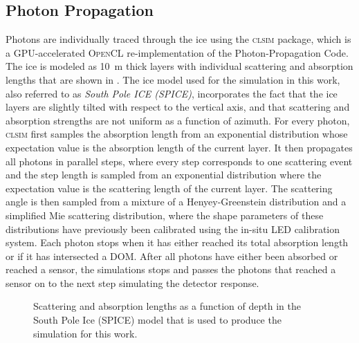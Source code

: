 \subsection{Photon Propagation}
\label{sec:photon-propagation}

Photons are individually traced through the ice using the \textsc{clsim}\cite{clsim} package, which is a GPU-accelerated \textsc{OpenCL} re-implementation of the Photon-Propagation Code.
 The ice is modeled as 10~m thick layers with individual scattering and absorption lengths that are shown in .
The ice model used for the simulation in this work, also referred to as \emph{South Pole ICE (SPICE)}, incorporates the fact that the ice layers are slightly tilted with respect to the vertical axis, and that scattering and absorption strengths are not uniform as a function of azimuth.
For every photon, \textsc{clsim} first samples the absorption length from an exponential distribution whose expectation value is the absorption length of the current layer.
It then propagates all photons in parallel steps, where every step corresponds to one scattering event and the step length is sampled from an exponential distribution where the expectation value is the scattering length of the current layer.
The scattering angle is then sampled from a mixture of a Henyey-Greenstein distribution and a simplified Mie scattering distribution, where the shape parameters of these distributions have previously been calibrated using the in-situ LED calibration system\cite{flasher_calibration}.
Each photon stops when it has either reached its total absorption length or if it has intersected a DOM.
After all photons have either been absorbed or reached a sensor, the simulations stops and passes the photons that reached a sensor on to the next step simulating the detector response.

\begin{figure}
    \centering
    
    \caption{Scattering and absorption lengths as a function of depth in the South Pole Ice (SPICE) model that is used to produce the simulation for this work.}
    \label{fig:spice-model}
\end{figure}


